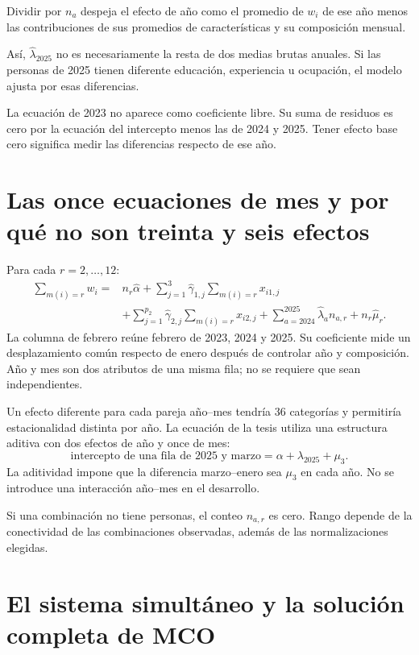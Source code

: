 \documentclass[11pt,a4paper]{article}
\begin{document}
Dividir por $n_a$ despeja el efecto de año como el promedio de $w_i$ de ese año menos las contribuciones de sus promedios de características y su composición mensual.

Así, $\widehat\lambda_{2025}$ no es necesariamente la resta de dos medias brutas anuales. Si las personas de 2025 tienen diferente educación, experiencia u ocupación, el modelo ajusta por esas diferencias.

La ecuación de 2023 no aparece como coeficiente libre. Su suma de residuos es cero por la ecuación del intercepto menos las de 2024 y 2025. Tener efecto base cero significa medir las diferencias respecto de ese año.

\clearpage
\section{Las once ecuaciones de mes y por qué no son treinta y seis efectos}

Para cada $r=2,\ldots,12$:
\[
\begin{aligned}
\sum_{m(i)=r}w_i={}&n_r\widehat\alpha
+\sum_{j=1}^3\widehat\gamma_{1,j}\sum_{m(i)=r}x_{i1,j}\\
&+\sum_{j=1}^{p_2}\widehat\gamma_{2,j}\sum_{m(i)=r}x_{i2,j}
+\sum_{a=2024}^{2025}\widehat\lambda_a n_{a,r}
+n_r\widehat\mu_r.
\end{aligned}
\]
La columna de febrero reúne febrero de 2023, 2024 y 2025. Su coeficiente mide un desplazamiento común respecto de enero después de controlar año y composición. Año y mes son dos atributos de una misma fila; no se requiere que sean independientes.

Un efecto diferente para cada pareja año--mes tendría 36 categorías y permitiría estacionalidad distinta por año. La ecuación de la tesis utiliza una estructura aditiva con dos efectos de año y once de mes:
\[
\text{intercepto de una fila de 2025 y marzo}
=\alpha+\lambda_{2025}+\mu_3.
\]
La aditividad impone que la diferencia marzo--enero sea $\mu_3$ en cada año. No se introduce una interacción año--mes en el desarrollo.

Si una combinación no tiene personas, el conteo $n_{a,r}$ es cero. Rango depende de la conectividad de las combinaciones observadas, además de las normalizaciones elegidas.

\clearpage
\section{El sistema simultáneo y la solución completa de MCO}
\end{document}
